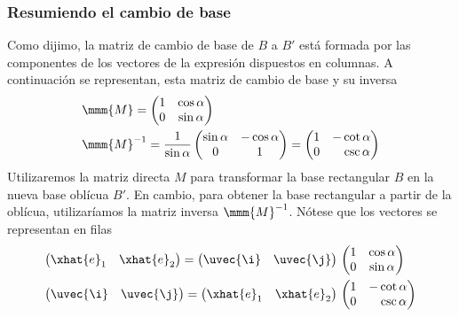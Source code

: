 \subsubsection{Resumiendo el cambio de base}
Como dijimo, la matriz de cambio de base de $B$ a $B'$ está formada por las componentes
de los vectores de la expresión dispuestos en columnas. A continuación se representan, esta matriz de cambio de base y su inversa
\begin{subequations}
  \begin{align}
    \label{eq:R2-oblic_M}
    &\mmm{M}
      =
      \begin{pmatrix}
        1 & \cos\alpha\\
        0 & \sin\alpha
      \end{pmatrix}\\
    \label{eq:R2-oblic_Minv}
    &\mmm{M}^{-1}
      =
      \dfrac{1}{\sin\alpha}
      \begin{pmatrix}
        \sin\alpha & -\cos\alpha\\
        0 & 1        
      \end{pmatrix}
      =
      \begin{pmatrix}
        1 & -\cot\alpha\\
        0 & \phantom{-}\csc\alpha
      \end{pmatrix}
  \end{align}
\end{subequations}
Utilizaremos la matriz directa $M$ para transformar la base rectangular $B$ en la nueva
base oblícua $B'$. En cambio, para obtener la base rectangular a partir de la oblícua,
utilizaríamos la matriz inversa $\mmm{M}^{-1}$. Nótese que los vectores se representan en
filas
\begin{subequations}
\begin{align}
  &\begin{pmatrix}
    \xhat{e}_1 &  \xhat{e}_2
  \end{pmatrix}
  =
    \begin{pmatrix}
      \uvec{\i} & \uvec{\j}
    \end{pmatrix}
    \,
    \begin{pmatrix}
      1 & \cos\alpha\\
      0 & \sin\alpha
    \end{pmatrix}\\
  &\begin{pmatrix}
    \uvec{\i} & \uvec{\j}
  \end{pmatrix}
  =
    \begin{pmatrix}
      \xhat{e}_1 & \xhat{e}_2
    \end{pmatrix}
    \,
    \begin{pmatrix}
      1 & -\cot\alpha\\
      0 & \phantom{-}\csc\alpha
    \end{pmatrix}
    \,
\end{align}
\end{subequations}


